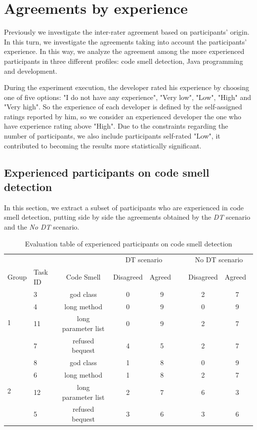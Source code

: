 \section{Agreements by experience} \label{sec:participantExperienceAgreement}

Previously we investigate the inter-rater agreement based on participants’ origin. In this turn, we investigate the agreements taking into account the participants’ experience. In this way, we analyze the agreement among the more experienced participants in three different profiles: code smell detection, Java programming and development.

During the experiment execution, the developer rated his experience by choosing one of five options: "I do not have any experience", "Very low", "Low", "High" and "Very high".  So the experience of each developer is defined by the self-assigned ratings reported by him, so we consider an experienced developer the one who have experience rating above "High". Due to the constraints regarding the number of participants, we also include participants self-rated "Low", it contributed to becoming the results more statistically significant. 

\subsection{Experienced participants on code smell detection} \label{sec:participantsCodeSmellDetecAgreement}    
In this section, we extract a subset of participants who are experienced in code smell detection, putting side by side the agreements obtained by the \textit{DT} scenario and the  \textit{No DT} scenario. 

\begin{table}[ht]
\centering
\begin{tabular}{llccclcc} 
\toprule
 &  & \multicolumn{1}{l}{} & \multicolumn{2}{c}{DT scenario} & \multicolumn{1}{c}{} & \multicolumn{2}{c}{No DT scenario} \\ 
\cmidrule{4-5}\cmidrule{7-8}
Group & Task ID & Code Smell & Disagreed & Agreed~ &  & \multicolumn{1}{l}{Disagreed} & \multicolumn{1}{l}{Agreed~} \\ 
\midrule
\multirow{4}{*}{1} & 3 & god class & 0 & 9 &  & 2 & 7 \\
 & 4 & long method & 0 & 9 &  & 0 & 9 \\
 & 11 & long parameter list & 0 & 9 &  & 2 & 7 \\
 & 7 & refused bequest & 4 & 5 &  & 2 & 7 \\ 
\midrule
\multirow{4}{*}{2} & 8 & god class & 1 & 8 &  & 0 & 9 \\
 & 6 & long method & 1 & 8 &  & 2 & 7 \\
 & 12 & long parameter list & 2 & 7 &  & 6 & 3 \\
 & 5 & refused bequest & 3 & 6 &  & 3 & 6 \\
\bottomrule
\end{tabular}
\caption{Evaluation table of experienced participants on code smell detection}
\label{tbl:codeSmellDetectionTableEvaluation}
\end{table}

